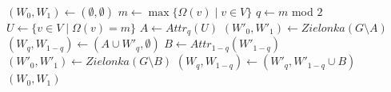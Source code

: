 \documentclass{article}
\begin{document}
\begin{algorithm}[H]
    \caption{Zielonka($G$) \cite{aggarwal:2023}}
    \footnotesize
    \begin{algorithmic}[1]
        \State $(W_0, W_1) \gets (\emptyset, \emptyset)$
    \Else
        \State $m \gets \max\{\Omega(v) \mid v \in V\}$
        \State $q \gets m $ mod $ 2$
        \State $U \gets \{v \in V \mid \Omega(v) = m\}$
        \State $A \gets Attr_q(U)$
        \State $(W'_0, W'_1) \gets Zielonka(G \setminus A)$
            \State $(W_q, W_{1-q}) \gets (A \cup W'_q, \emptyset)$
        \Else
            \State $B \gets Attr_{1-q}(W'_{1-q})$
            \State $(W'_0, W'_1) \gets Zielonka(G \setminus B)$
            \State $(W_q, W_{1-q}) \gets (W'_q, W'_{1-q} \cup B)$
        \EndIf
    \EndIf
    \State \Return $(W_0, W_1)$
    \end{algorithmic}
    \label{alg:zielonka}
\end{algorithm}


\newpage



\end{document}
